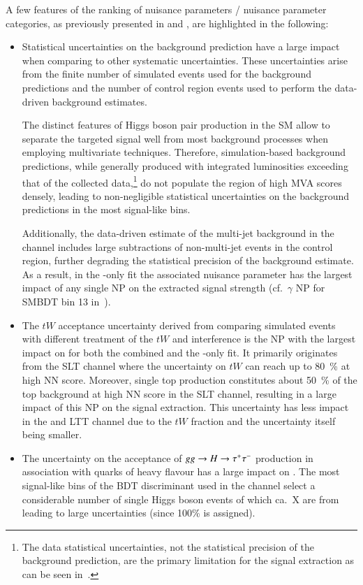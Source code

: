 A few features of the ranking of nuisance parameters / nuisance
parameter categories, as previously presented in
 and , are
highlighted in the following:
\begin{itemize}
\item Statistical uncertainties on the background prediction have a
  large impact when comparing to other systematic uncertainties. These
  uncertainties arise from the finite number of simulated events used
  for the background predictions and the number of control region
  events used to perform the data-driven \faketauhadvis background
  estimates.

  The distinct features of Higgs boson pair production in the SM allow
  to separate the targeted signal well from most background processes
  when employing multivariate techniques. Therefore, simulation-based
  background predictions, while generally produced with integrated
  luminosities exceeding that of the collected data,\footnote{The data
    statistical uncertainties, not the statistical precision of the
    background prediction, are the primary limitation for the signal
    extraction as can be seen in~.} do not
  populate the region of high MVA scores densely, leading to
  non-negligible statistical uncertainties on the background
  predictions in the most signal-like bins.

  Additionally, the data-driven estimate of the multi-jet background
  in the \hadhad channel includes large subtractions of non-multi-jet
  events in the control region, further degrading the statistical
  precision of the background estimate. As a result, in the
  \hadhad-only fit the associated nuisance parameter has the largest
  impact of any single NP on the extracted signal strength (cf.\
  $\gamma$ NP for SMBDT bin 13
  in~).

\item The $tW$ acceptance uncertainty derived from comparing simulated
  events with different treatment of the $tW$ and \ttbar interference
  is the NP with the largest impact on \muhat for both the combined
  and the \lephad-only fit. It primarily originates from the \lephad
  SLT channel where the uncertainty on $tW$ can reach up to
  \SI{80}{\percent} at high NN score. Moreover, single top production
  constitutes about \SI{50}{\percent} of the top background at high NN
  score in the \lephad SLT channel, resulting in a large impact of
  this NP on the signal extraction. This uncertainty has less impact
  in the \hadhad and \lephad LTT channel due to the $tW$ fraction and
  the uncertainty itself being smaller.

\item The uncertainty on the acceptance of $gg \to H \to \tau^{+} \tau^{-}$
  production in association with quarks of heavy flavour has a large
  impact on \muhat. The most signal-like bins of the BDT discriminant
  used in the \hadhad channel select a considerable number of single
  Higgs boson events of which ca.\ X are from \ggF leading to large
  uncertainties (since 100\% is assigned).
\end{itemize}

